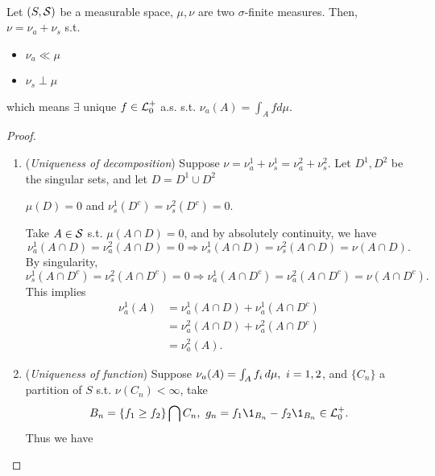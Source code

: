 \begin{theorem}\label{Lebesgue decomposition}\ \\
Let $(S, \mathcal{S})$ be a measurable space, $\mu,\nu$ are two $\sigma$-finite measures. Then, $\nu = \nu_a + \nu_s$ s.t.
\begin{itemize}
    \item $\nu_a \ll \mu$
    \item $\nu_s \perp \mu$
\end{itemize}
which means $\exists$ unique $f \in \mathcal{L}_0^+$ a.s. s.t. $\nu_a(A) = \int_A f d\mu$.
\end{theorem}
\begin{proof}\
\begin{enumerate}
    \item (\textit{Uniqueness of decomposition}) Suppose $\nu = \nu_a^1 + \nu_s^1 = \nu_a^2 + \nu_s^2$. Let $D^1, D^2$ be the singular sets, and let $D = D^1 \cup D^2$ \imply
    \begin{center}
        $\mu(D) = 0$ and $\nu_s^1(D^c) = \nu_s^2(D^c) = 0$.
    \end{center}
    Take $A \in \mathcal{S}$ s.t. $\mu(A \cap D) = 0$, and by absolutely continuity, we have
    \begin{equation*}
        \nu_a^1(A\cap D) = \nu_a^2(A \cap D) = 0 \Rightarrow \nu_s^1(A \cap D) = \nu_s^2(A \cap D) = \nu(A \cap D).
    \end{equation*}
    By singularity,
    \begin{equation*}
        \nu_s^1(A \cap D^c) = \nu_s^2 (A \cap D^c) = 0 \Rightarrow \nu_a^1 (A \cap D^c) = \nu^2_a (A \cap D^c) = \nu(A \cap D^c).
    \end{equation*}
    This implies
    \begin{align*}
        \nu_a^1(A) &= \nu_a^1 (A \cap D) + \nu_a^1 (A \cap D^c)\\
        &= \nu_a^2 (A \cap D) + \nu_a^2(A \cap D^c)\\
        &= \nu_a^2 (A). 
    \end{align*}
    \item (\textit{Uniqueness of function}) Suppose $\nu_a(A) = \int_A f_i \,d\mu,\ i = 1,2$, and $\{C_n\}$ a partition of $S$ s.t. $\nu(C_n) < \infty$, take
    \begin{equation*}
        B_n = \{f_1 \geq f_2\} \cap C_n,\ g_n = f_1 \1_{B_n} - f_2 \1_{B_n} \in \Ls_0^+.
    \end{equation*}
    Thus we have
    \begin{equation*}

\end{equation*}
\end{enumerate}
\end{proof}
